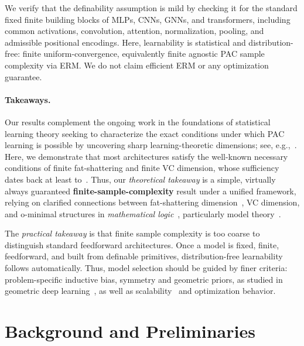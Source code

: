 \documentclass{article}
\theoremstyle{plain}
\theoremstyle{definition}
\theoremstyle{remark}
\theoremstyle{plain}
\numberwithin{thm}{section}
\theoremstyle{definition}
\numberwithin{equation}{section}
\begin{document}
We verify that the definability assumption is mild by checking it for the standard fixed finite building blocks of MLPs, CNNs, GNNs, and transformers, including common activations, convolution, attention, normalization, pooling, and admissible positional encodings.
Here, learnability is statistical and distribution-free: finite uniform-convergence, equivalently finite agnostic PAC sample complexity via ERM.  We do not claim efficient ERM or any optimization guarantee.

\paragraph{Takeaways.} Our results complement the ongoing work in the foundations of statistical learning theory seeking to characterize the exact conditions under which PAC learning is possible by uncovering sharp learning-theoretic dimensions; see, e.g.,~\cite{attias2023optimal,bressan2025fine}.  
Here, we demonstrate that most architectures satisfy the well-known necessary conditions of finite fat-shattering and finite VC dimension, whose sufficiency dates back at least to~\cite{AlonBenDavidCesaBianchiHaussler_PDGeneralization}.
Thus, our \emph{theoretical takeaway} is a simple, virtually always guaranteed \textbf{finite-sample-complexity} result under a unified framework, relying on clarified connections between fat-shattering dimension~\cite{BartlettKulkarniPosner_CoveringFatShattering_1997}, VC dimension, and o-minimal structures in \emph{mathematical logic}~\cite{PillaySteinhorn1986DefinableSetsOrderedStructuresI}, particularly model theory~\cite{vandenDries1998tame,coste1999introduction,speissegger1999pfaffian}.  

The \emph{practical takeaway} is that finite sample complexity is too coarse to distinguish standard feedforward architectures.  Once a model is fixed, finite, feedforward, and built from definable primitives, distribution-free learnability follows automatically.  Thus, model selection should be guided by finer criteria: problem-specific inductive bias, symmetry and geometric priors, as studied in geometric deep learning~\cite{Bronstein2016GeometricDL,bronstein2021geometric,borde2025mathematicalfoundationsgeometricdeep}, as well as scalability~\cite{kaplan2020scalinglawsneurallanguage} and optimization behavior.

\section{Background and Preliminaries}
\label{s:Background}
\end{document}
